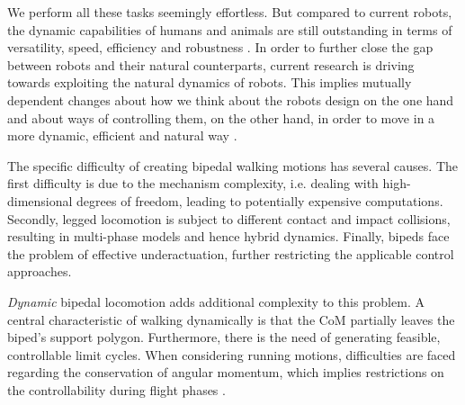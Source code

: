 We perform all these tasks seemingly effortless. But compared to current robots, the dynamic capabilities of humans and animals are still outstanding in terms of versatility, speed, efficiency and robustness \cite{hutter2012starleth}. In order to further close the gap between robots and their natural counterparts, current research is driving towards exploiting the natural dynamics of robots. This implies mutually dependent changes about how we think about the robots design \cite{pratt2004series} on the one hand and about ways of controlling them, on the other hand, in order to move in a more dynamic, efficient and natural way \cite{collins2005efficient, haddadin2012optimal, pratt2000exploiting}.

The specific difficulty of creating bipedal walking motions has several causes. The first difficulty is due to the mechanism complexity, i.e. dealing with high-dimensional degrees of freedom, leading to potentially expensive computations. Secondly, legged locomotion is subject to different contact and impact collisions, resulting in multi-phase models and hence hybrid dynamics. Finally, bipeds face the problem of effective underactuation, further restricting the applicable control approaches.

\textit{Dynamic} bipedal locomotion adds additional complexity to this problem. A central characteristic of walking dynamically is that the \gls{CoM} partially leaves the biped's support polygon. Furthermore, there is the need of generating feasible, controllable limit cycles. When considering running motions, difficulties are faced regarding the conservation of angular momentum, which implies restrictions on the controllability during flight phases \cite{westervelt2018feedback}. 


